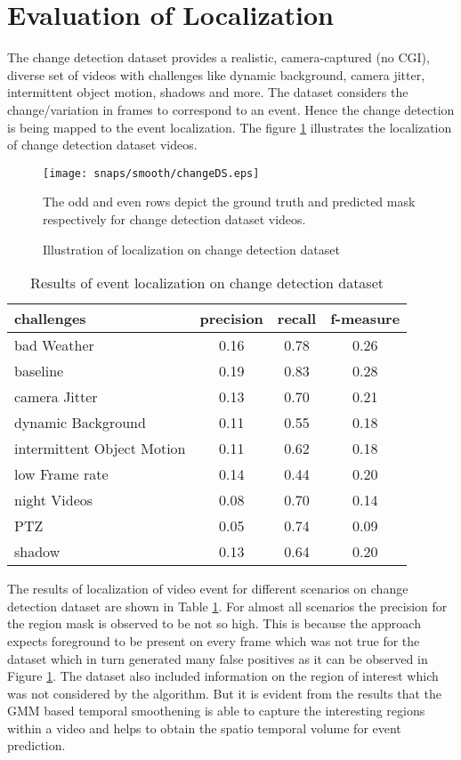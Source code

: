 \section{Evaluation of Localization}
\label{sec:EvLoc}
The change detection dataset \citep{cdnet} provides  a realistic, camera-captured (no CGI), diverse set of videos with challenges like dynamic background, camera jitter, intermittent object motion, shadows and more.  The dataset considers the change/variation in frames to correspond to an event. Hence the change detection is being mapped to the event localization.  The figure \ref{fig:changeDb} illustrates the localization of change detection dataset videos.
\begin{figure}[htpb]
   \begin{center}
	    \texttt{[image: snaps/smooth/changeDS.eps]}     
     \caption {Illustration of localization on change detection dataset}
   \label{fig:changeDb}
    \medskip \small The odd and even rows depict the ground truth and predicted mask respectively for change detection dataset videos. 
   \end{center}
 \end{figure}
\begin{table}[htbp]
   \caption{Results of event localization on change detection dataset}
   \begin{center}
   \begin{tabular}{|l|c|c|c|} \hline
        \textbf{challenges} & \textbf{precision} & \textbf{recall} & \textbf{f-measure} \\ \hline
		bad Weather & 0.16 & 0.78 & 0.26\\
		baseline & 0.19 & 0.83 & 0.28\\
		camera Jitter & 0.13 & 0.70 & 0.21 \\
		dynamic Background & 0.11 & 0.55 &  0.18\\
		intermittent Object Motion & 0.11 & 0.62 & 0.18 \\
		low Frame rate & 0.14 & 0.44 & 0.20 \\
		night Videos & 0.08 & 0.70 & 0.14 \\
		PTZ & 0.05 & 0.74 & 0.09\\
		shadow & 0.13 & 0.64 & 0.20\\ \hline
   \end{tabular}
   \label{tab:evalLoc}
   \end{center}
 \end{table} 
\par The results of localization of video event for different scenarios on change detection dataset are shown in Table \ref{tab:evalLoc}. For almost all scenarios the precision for the region mask is observed to be not so high. This is because the approach expects foreground to be present on every frame which was not true for the dataset which in turn generated many false positives as it can be observed in Figure \ref{fig:changeDb}.  The dataset also included information on the region of interest which was not considered by the algorithm.  But it is evident from the results that the GMM based temporal smoothening is able to capture the interesting regions within a video and helps to obtain the spatio temporal volume for event prediction.

